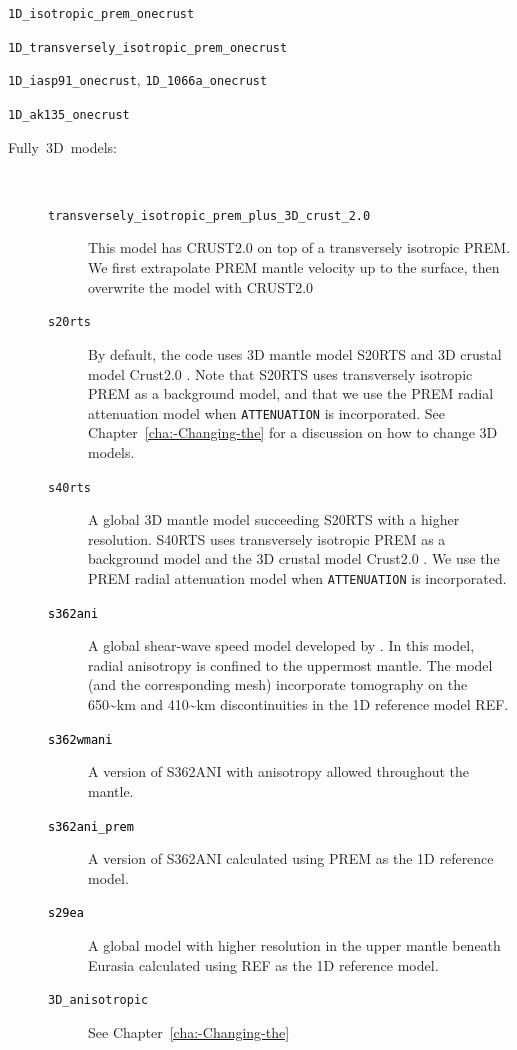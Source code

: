 \documentclass[oneside,english]{book}
\begin{document}
\texttt{1D\_isotropic\_prem\_onecrust}

\texttt{1D\_transversely\_isotropic\_prem\_onecrust}

\texttt{1D\_iasp91\_onecrust}, \texttt{1D\_1066a\_onecrust}

\texttt{1D\_ak135\_onecrust}

\begin{description}
\item [{\textmd{Fully~3D~models:}}]~

\begin{description}
\item [{\texttt{transversely\_isotropic\_prem\_plus\_3D\_crust\_2.0}}] This
model has CRUST2.0 \citep{BaLaMa00} on top of a transversely isotropic
PREM. We first extrapolate PREM mantle velocity up to the surface,
then overwrite the model with CRUST2.0
\item [{\texttt{s20rts}}] By default, the code uses 3D mantle model S20RTS
\citep{RiVaWo99} and 3D crustal model Crust2.0 \citep{BaLaMa00}.
Note that S20RTS uses transversely isotropic PREM as a background
model, and that we use the PREM radial attenuation model when \texttt{ATTENUATION}
is incorporated. See Chapter~\ref{cha:-Changing-the} for a discussion
on how to change 3D models.
\item [{\texttt{s40rts}}] A global 3D mantle model \citep{RiDeVaWo10} succeeding S20RTS
with a higher resolution.
S40RTS uses transversely isotropic PREM as a background
model and the 3D crustal model Crust2.0 \citep{BaLaMa00}.
We use the PREM radial attenuation model when \texttt{ATTENUATION}
is incorporated.
\item [{\texttt{\textcolor{black}{s362ani}}}] A global shear-wave speed
model developed by \citet{KuDzEk06}. In this model, radial anisotropy
is confined to the uppermost mantle. The model (and the corresponding
mesh) incorporate tomography on the 650\textasciitilde{}km and 410\textasciitilde{}km
discontinuities in the 1D reference model REF.
\item [{\texttt{\textcolor{black}{s362wmani}}}] A version of S362ANI with
anisotropy allowed throughout the mantle.
\item [{\texttt{\textcolor{black}{s362ani\_prem}}}] A version of S362ANI
calculated using PREM as the 1D reference model.
\item [{\texttt{\textcolor{black}{s29ea}}}] A global model with higher
resolution in the upper mantle beneath Eurasia calculated using REF
as the 1D reference model.
\item [{\texttt{3D\_anisotropic}}] See Chapter~\ref{cha:-Changing-the}

\end{description}
\end{description}
\end{document}
